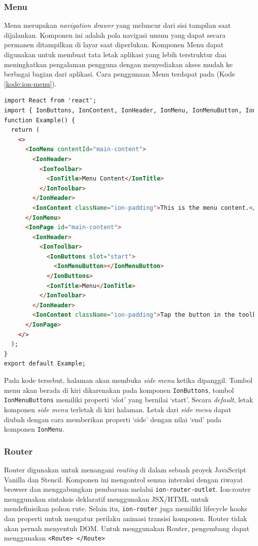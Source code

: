 \subsubsection{Menu}
Menu merupakan \textit{navigation drawer} yang meluncur dari sisi tampilan saat dijalankan. Komponen ini adalah pola navigasi umum yang dapat secara permanen ditampilkan di layar saat diperlukan. Komponen Menu dapat digunakan untuk membuat tata letak aplikasi yang lebih terstruktur dan meningkatkan pengalaman pengguna dengan menyediakan akses mudah ke berbagai bagian dari aplikasi. Cara penggunaan Menu terdapat pada (Kode \ref{kode:ion-menu}).

\begin{lstlisting}[language=HTML, caption=Contoh Kode Penggunaan Menu, label=kode:ion-menu]
import React from 'react';
import { IonButtons, IonContent, IonHeader, IonMenu, IonMenuButton, IonPage, IonTitle, IonToolbar } from '@ionic/react';
function Example() {
  return (
    <>
      <IonMenu contentId="main-content">
        <IonHeader>
          <IonToolbar>
            <IonTitle>Menu Content</IonTitle>
          </IonToolbar>
        </IonHeader>
        <IonContent className="ion-padding">This is the menu content.</IonContent>
      </IonMenu>
      <IonPage id="main-content">
        <IonHeader>
          <IonToolbar>
            <IonButtons slot="start">
              <IonMenuButton></IonMenuButton>
            </IonButtons>
            <IonTitle>Menu</IonTitle>
          </IonToolbar>
        </IonHeader>
        <IonContent className="ion-padding">Tap the button in the toolbar to open the menu.</IonContent>
      </IonPage>
    </>
  );
}
export default Example;
\end{lstlisting}

Pada kode tersebut, halaman akan membuka \textit{side menu} ketika dipanggil. Tombol menu akan berada di kiri dikarenakan pada komponen \texttt{IonButtons}, tombol \texttt{IonMenuButtons} memiliki properti `slot' yang bernilai `start'. Secara \textit{default}, letak komponen \textit{side menu} terletak di kiri halaman. Letak dari \textit{side menu} dapat diubah dengan cara memberikan properti `side' dengan nilai `end' pada komponen \texttt{IonMenu}.

\subsubsection{Router}
\label{subbab:router}
Router digunakan untuk menangani \textit{routing} di dalam sebuah proyek JavaScript Vanilla dan Stencil. Komponen ini mengontrol semua interaksi dengan riwayat browser dan menggabungkan pembaruan melalui \texttt{ion-router-outlet}. Ion-router menggunakan sintaksis deklaratif menggunakan JSX/HTML untuk mendefinisikan pohon rute. Selain itu, \texttt{ion-router} juga memiliki lifecycle hooks dan properti untuk mengatur perilaku animasi transisi komponen. Router tidak akan pernah menyentuh DOM. Untuk menggunakan Router, pengembang dapat menggunakan \texttt{<Route> </Route>}

